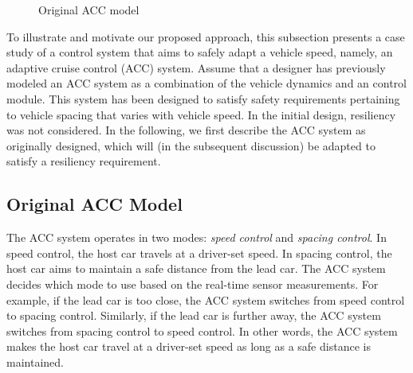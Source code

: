 \begin{figure}[t!]
\begin{adjustbox}{max size={0.99\columnwidth}{0.75\textheight}}
%
	\end{adjustbox}%
	\caption{Original ACC model}%
\end{figure}

To illustrate and motivate our proposed approach, this subsection presents a case study of a control system that aims to safely adapt a vehicle speed, namely, an adaptive cruise control (ACC) system. 
%
%
Assume that a designer has previously modeled an ACC system as a combination of the vehicle dynamics and an control module. This system has been designed to satisfy safety requirements pertaining to vehicle spacing that varies with vehicle speed. In the initial design, resiliency was not considered. In the following, we first describe the ACC system as originally designed, which will (in the subsequent discussion) be adapted to satisfy a resiliency requirement.

\subsection{Original ACC Model}
The ACC system operates in two modes: \emph{speed control} and \emph{spacing control}. In speed control, the host car travels at a driver-set speed. In spacing control, the host car aims to maintain a safe distance from the lead car. The ACC system decides which mode to use based on the real-time sensor measurements. For example, if the lead car is too close, the ACC system switches from speed control to spacing control. 
%
Similarly, if the lead car is further away, the ACC system switches from spacing control to speed control. In other words, the ACC system makes the host car travel at a driver-set speed as long as a safe distance is maintained.

